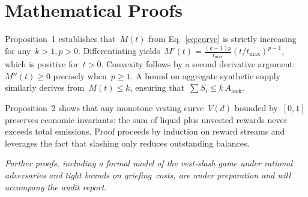 \documentclass[11pt]{article}
\begin{document}
\appendix
\section{Mathematical Proofs}
\label{app:proofs}
Proposition~1 establishes that~\(M(t)\) from Eq.~\eqref{eq:curve} is strictly increasing for any~\(k>1, p>0\). Differentiating yields~\(M'(t)=\frac{(k-1)p}{t_{\max}}(t/t_{\max})^{p-1}\), which is positive for~\(t>0\). Convexity follows by a second derivative argument:~\(M''(t)\ge0\) precisely when~\(p\ge1\). A bound on aggregate synthetic supply similarly derives from~\(M(t)\le k\), ensuring that~\(\sum S_i\le k\,A_{\text{lock}}\).

Proposition~2 shows that any monotone vesting curve~\(V(d)\) bounded by~\([0,1]\) preserves economic invariants: the sum of liquid plus unvested rewards never exceeds total emissions. Proof proceeds by induction on reward streams and leverages the fact that slashing only reduces outstanding balances.

\vspace{1em}
\textit{Further proofs, including a formal model of the vest‑slash game under rational adversaries and tight bounds on griefing costs, are under preparation and will accompany the audit report.}
\end{document}
